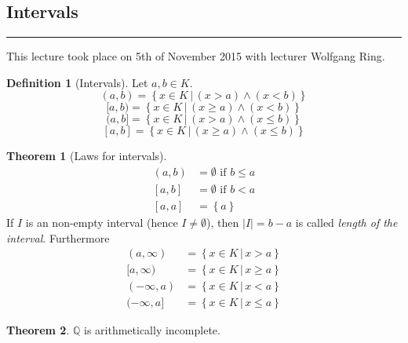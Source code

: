 \documentclass[a4paper,landscape,twocolumn]{article}
\theoremstyle{definition}
\newtheorem{theorem}{Theorem}
\newtheorem{defi}{Definition}
\newcommand\set[1]{\left\{#1\right\}}
\newcommand\setdef[2]{\left\{#1\,|\,#2\right\}}
\newcommand\abs[1]{\left|#1\right|}
\newcommand\meta[3]{\hrule{} This #1 took place on #2 with lecturer #3.\par}
\begin{document}
\subsection{Intervals}
\meta{lecture}{5th of November 2015}{Wolfgang Ring}

\begin{defi}[Intervals]
  Let $a, b \in K$.
  \[ (a,b) = \setdef{x \in K}{(x > a) \land (x < b)} \]
  \[ [a, b) = \setdef{x \in K}{(x \geq a) \land (x < b)} \]
  \[ (a, b] = \setdef{x \in K}{(x > a) \land (x \leq b)} \]
  \[ [a, b] = \setdef{x \in K}{(x \geq a) \land (x \leq b)} \]
\end{defi}


\begin{theorem}[Laws for intervals]
  \begin{align}
    (a, b) &= \emptyset \text{ if } b \leq a \\
    [a, b] &= \emptyset \text{ if } b < a \\
    [a, a] &= \set{a}
  \end{align}
  If $I$ is an non-empty interval (hence $I \neq \emptyset$),
  then $\abs{I} = b - a$ is called \emph{length of the interval}.
  Furthermore
  \begin{align}
    (a, \infty) &= \setdef{x \in K}{x > a} \\
    [a, \infty) &= \setdef{x \in K}{x \geq a} \\
    (-\infty, a) &= \setdef{x \in K}{x < a} \\
    (-\infty, a] &= \setdef{x \in K}{x \leq a}
  \end{align}
\end{theorem}

\begin{theorem}
  $\mathbb Q$ is arithmetically incomplete.
\end{theorem}
\end{document}
